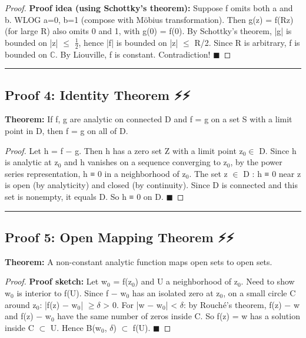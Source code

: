 \documentclass[12pt,a4paper,openany]{book}
\begin{document}
{{\begin{proof}
\textbf{Proof idea (using Schottky's theorem):}
Suppose f omits both a and b. WLOG a=0, b=1 (compose with Möbius transformation).
Then g(z) = f(Rz) (for large R) also omits 0 and 1, with g(0) = f(0).
By Schottky's theorem, |g| is bounded on |z| $\leq$ $\frac{1}{2}$, hence |f| is bounded on |z| $\leq$ R/2.
Since R is arbitrary, f is bounded on $\mathbb{C}$. By Liouville, f is constant. Contradiction! $\blacksquare$
\end{proof}

\bigskip\noindent\rule{\textwidth}{0.4pt}\bigskip

\subsection{Proof 4: Identity Theorem ⚡⚡}

\begin{tcolorbox}[colback=lightblue,colframe=thmblue,title=\textbf{Theorem},breakable,boxrule=1.5pt]
\textbf{Theorem:} If f, g are analytic on connected D and f = g on a set S with a limit point in D, then f = g on all of D.
\end{tcolorbox}

\begin{proof}

Let h = f − g. Then h has a zero set Z with a limit point z$_0\in$ D.
Since h is analytic at z$_0$ and h vanishes on a sequence converging to z$_0$, by the power series representation, h ≡ 0 in a neighborhood of z$_0$.
The set {z $\in$ D : h ≡ 0 near z} is open (by analyticity) and closed (by continuity).
Since D is connected and this set is nonempty, it equals D. So h ≡ 0 on D. $\blacksquare$
\end{proof}

\bigskip\noindent\rule{\textwidth}{0.4pt}\bigskip

\subsection{Proof 5: Open Mapping Theorem ⚡⚡}

\begin{tcolorbox}[colback=lightblue,colframe=thmblue,title=\textbf{Theorem},breakable,boxrule=1.5pt]
\textbf{Theorem:} A non-constant analytic function maps open sets to open sets.
\end{tcolorbox}

\begin{proof}
\textbf{Proof sketch:}
Let w$_0$ = f(z$_0$) and U a neighborhood of z$_0$. Need to show w$_0$ is interior to f(U).
Since f − w$_0$ has an isolated zero at z$_0$, on a small circle C around z$_0$: |f(z) − w$_0$| $\geq\delta$ > 0.
For |w − w$_0$| < $\delta$: by Rouché's theorem, f(z) − w and f(z) − w$_0$ have the same number of zeros inside C.
So f(z) = w has a solution inside C $\subset$ U. Hence B(w$_0$, $\delta$) $\subset$ f(U). $\blacksquare$
\end{proof}

}}
\end{document}
